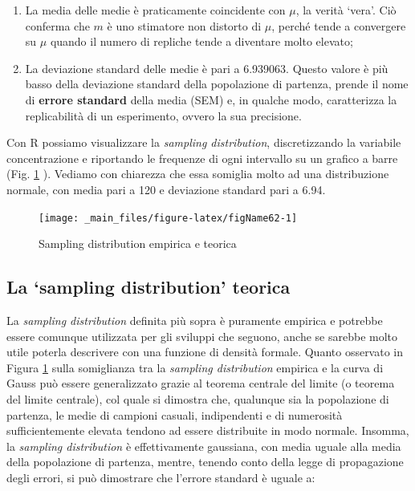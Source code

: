 \documentclass[a4paper,12pt,oneside]{book}
\providecommand{\tightlist}{%
  \setlength{\itemsep}{0pt}\setlength{\parskip}{0pt}}
\begin{document}
\begin{enumerate}
\def\labelenumi{\arabic{enumi}.}
\tightlist
\item
  La media delle medie è praticamente coincidente con \(\mu\), la verità `vera'. Ciò conferma che \(m\) è uno stimatore non distorto di \(\mu\), perché tende a convergere su \(\mu\) quando il numero di repliche tende a diventare molto elevato;
\item
  La deviazione standard delle medie è pari a 6.939063. Questo valore è più basso della deviazione standard della popolazione di partenza, prende il nome di \textbf{errore standard} della media (SEM) e, in qualche modo, caratterizza la replicabilità di un esperimento, ovvero la sua precisione.
\end{enumerate}

Con R possiamo visualizzare la \emph{sampling distribution}, discretizzando la variabile concentrazione e riportando le frequenze di ogni intervallo su un grafico a barre (Fig. \ref{fig:figName62} ). Vediamo con chiarezza che essa somiglia molto ad una distribuzione normale, con media pari a 120 e deviazione standard pari a 6.94.

\begin{figure}

{\centering \texttt{[image: \_main\_files/figure-latex/figName62-1]} 

}

\caption{Sampling distribution empirica e teorica}\label{fig:figName62}
\end{figure}

\hypertarget{la-sampling-distribution-teorica}{%
\subsection{La `sampling distribution' teorica}\label{la-sampling-distribution-teorica}}

La \emph{sampling distribution} definita più sopra è puramente empirica e potrebbe essere comunque utilizzata per gli sviluppi che seguono, anche se sarebbe molto utile poterla descrivere con una funzione di densità formale. Quanto osservato in Figura \ref{fig:figName62} sulla somiglianza tra la \emph{sampling distribution} empirica e la curva di Gauss può essere generalizzato grazie al teorema centrale del limite (o teorema del limite centrale), col quale si dimostra che, qualunque sia la popolazione di partenza, le medie di campioni casuali, indipendenti e di numerosità sufficientemente elevata tendono ad essere distribuite in modo normale. Insomma, la \emph{sampling distribution} è effettivamente gaussiana, con media uguale alla media della popolazione di partenza, mentre, tenendo conto della legge di propagazione degli errori, si può dimostrare che l'errore standard è uguale a:
\end{document}
